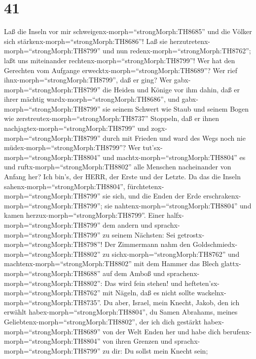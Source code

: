 \hypertarget{section-40}{%
\section{41}\label{section-40}}

 Laß die Inseln vor mir
schweigenx-morph=``strongMorph:TH8685'' und die Völker sich
stärkenx-morph=``strongMorph:TH8686''! Laß sie
herzutretenx-morph=``strongMorph:TH8799'' und nun
redenx-morph=``strongMorph:TH8762''; laßt uns miteinander
rechtenx-morph=``strongMorph:TH8799''!  Wer hat den
Gerechten vom Aufgange erwecktx-morph=``strongMorph:TH8689''? Wer rief
ihnx-morph=``strongMorph:TH8799'', daß er ging? Wer
gabx-morph=``strongMorph:TH8799'' die Heiden und Könige vor ihm dahin,
daß er ihrer mächtig wardx-morph=``strongMorph:TH8686'', und
gabx-morph=``strongMorph:TH8799'' sie seinem Schwert wie Staub und
seinem Bogen wie zerstreutex-morph=``strongMorph:TH8737'' Stoppeln,
 daß er ihnen nachjagtex-morph=``strongMorph:TH8799'' und
zogx-morph=``strongMorph:TH8799'' durch mit Frieden und ward des Wegs
noch nie müdex-morph=``strongMorph:TH8799''?  Wer
tut'sx-morph=``strongMorph:TH8804'' und
machtx-morph=``strongMorph:TH8804'' es und
ruftx-morph=``strongMorph:TH8802'' alle Menschen nacheinander von Anfang
her? Ich bin's, der HERR, der Erste und der Letzte.  Da das
die Inseln sahenx-morph=``strongMorph:TH8804'',
fürchtetenx-morph=``strongMorph:TH8799'' sie sich, und die Enden der
Erde erschrakenx-morph=``strongMorph:TH8799''; sie
nahtenx-morph=``strongMorph:TH8804'' und kamen
herzux-morph=``strongMorph:TH8799''.  Einer
halfx-morph=``strongMorph:TH8799'' dem andern und
sprachx-morph=``strongMorph:TH8799'' zu seinem Nächsten: Sei
getrostx-morph=``strongMorph:TH8798''!  Der Zimmermann nahm
den Goldschmiedx-morph=``strongMorph:TH8802'' zu
sichx-morph=``strongMorph:TH8762'' und
machtenx-morph=``strongMorph:TH8802'' mit dem Hammer das Blech
glattx-morph=``strongMorph:TH8688'' auf dem Amboß und
sprachenx-morph=``strongMorph:TH8802'': Das wird fein stehen! und
hefteten'sx-morph=``strongMorph:TH8762'' mit Nägeln, daß es nicht sollte
wackelnx-morph=``strongMorph:TH8735''.  Du aber, Israel,
mein Knecht, Jakob, den ich erwählt habex-morph=``strongMorph:TH8804'',
du Samen Abrahams, meines Geliebtenx-morph=``strongMorph:TH8802'',
 der ich dich gestärkt habex-morph=``strongMorph:TH8689''
von der Welt Enden her und habe dich
berufenx-morph=``strongMorph:TH8804'' von ihren Grenzen und
sprachx-morph=``strongMorph:TH8799'' zu dir: Du sollst mein Knecht sein;
